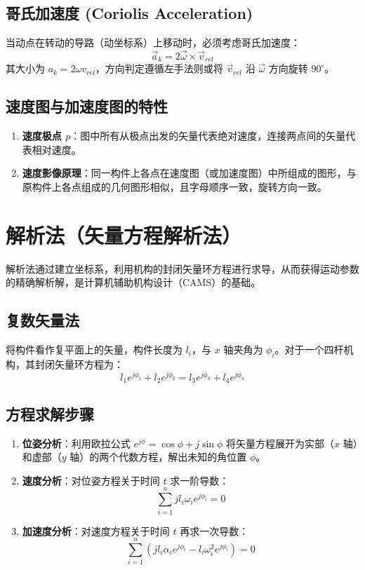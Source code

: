 \subsection{哥氏加速度 (Coriolis Acceleration)}
当动点在转动的导路（动坐标系）上移动时，必须考虑哥氏加速度：
\begin{equation}
	\vec{a}_k = 2\vec{\omega} \times \vec{v}_{rel}
\end{equation}
其大小为 $a_k = 2\omega v_{rel}$，方向判定遵循左手法则或将 $\vec{v}_{rel}$ 沿 $\vec{\omega}$ 方向旋转 $90^\circ$。

\subsection{速度图与加速度图的特性}
\begin{enumerate}
	\item \textbf{速度极点 $p$}：图中所有从极点出发的矢量代表绝对速度，连接两点间的矢量代表相对速度。
	\item \textbf{速度影像原理}：同一构件上各点在速度图（或加速度图）中所组成的图形，与原构件上各点组成的几何图形相似，且字母顺序一致，旋转方向一致。
\end{enumerate}

\section{解析法（矢量方程解析法）}

解析法通过建立坐标系，利用机构的封闭矢量环方程进行求导，从而获得运动参数的精确解析解，是计算机辅助机构设计（CAMS）的基础。

\subsection{复数矢量法}
将构件看作复平面上的矢量，构件长度为 $l_i$，与 $x$ 轴夹角为 $\phi_i$。对于一个四杆机构，其封闭矢量环方程为：
\begin{equation}
	l_1 e^{j\phi_1} + l_2 e^{j\phi_2} = l_3 e^{j\phi_3} + l_4 e^{j\phi_4}
\end{equation}

\subsection{方程求解步骤}
\begin{enumerate}
	\item \textbf{位姿分析}：利用欧拉公式 $e^{j\phi} = \cos\phi + j\sin\phi$ 将矢量方程展开为实部（$x$ 轴）和虚部（$y$ 轴）的两个代数方程，解出未知的角位置 $\phi$。
	\item \textbf{速度分析}：对位姿方程关于时间 $t$ 求一阶导数：
	\begin{equation}
		\sum_{i=1}^n j l_i \omega_i e^{j\phi_i} = 0
	\end{equation}
	\item \textbf{加速度分析}：对速度方程关于时间 $t$ 再求一次导数：
	\begin{equation}
		\sum_{i=1}^n (j l_i \alpha_i e^{j\phi_i} - l_i \omega_i^2 e^{j\phi_i}) = 0
	\end{equation}
\end{enumerate}

